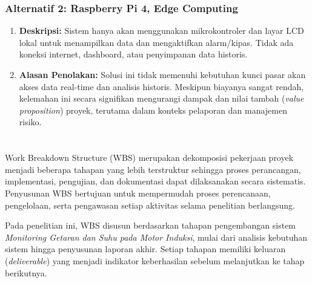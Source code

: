 \documentclass{elsinta}
\begin{document}
\subsubsection*{Alternatif 2: Raspberry Pi 4, Edge Computing}
\begin{enumerate}
    \item \textbf{Deskripsi:} Sistem hanya akan menggunakan mikrokontroler dan layar $\text{LCD}$ lokal untuk menampilkan data dan mengaktifkan alarm/kipas. Tidak ada koneksi internet, dashboard, atau penyimpanan data historis.
    \item \textbf{Alasan Penolakan:} Solusi ini tidak memenuhi kebutuhan kunci pasar akan akses data real-time dan analisis historis. Meskipun biayanya sangat rendah, kelemahan ini secara signifikan mengurangi dampak dan nilai tambah (\textit{value proposition}) proyek, terutama dalam konteks pelaporan dan manajemen risiko.
\end{enumerate}

\section{\ImplementationPlanTitle}

Work Breakdown Structure (WBS) merupakan dekomposisi pekerjaan proyek menjadi beberapa tahapan yang lebih terstruktur sehingga proses perancangan, implementasi, pengujian, dan dokumentasi dapat dilaksanakan secara sistematis. Penyusunan WBS bertujuan untuk mempermudah proses perencanaan, pengelolaan, serta pengawasan setiap aktivitas selama penelitian berlangsung.

Pada penelitian ini, WBS disusun berdasarkan tahapan pengembangan sistem \textit{Monitoring Getaran dan Suhu pada Motor Induksi}, mulai dari analisis kebutuhan sistem hingga penyusunan laporan akhir. Setiap tahapan memiliki keluaran (\textit{deliverable}) yang menjadi indikator keberhasilan sebelum melanjutkan ke tahap berikutnya.

\subsection{\WBSTitle}
\end{document}
